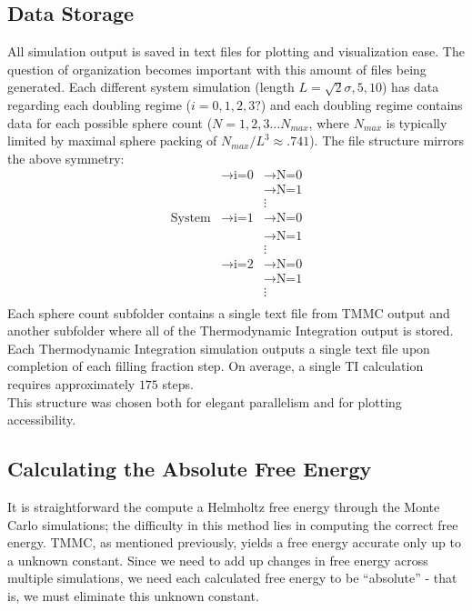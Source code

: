 \documentclass[12pt]{article}
\begin{document}
\subsection{Data Storage}
All simulation output is saved in text files for plotting and visualization ease. The question of organization becomes important with this amount of files being generated. Each different system simulation (length $L = \sqrt2 \sigma, 5,10$) has data regarding each doubling regime ($i=0,1,2,3?$) and each doubling regime contains data for each possible sphere count ($N=1,2,3\dots N_{max}$, where $N_{max}$ is typically limited by maximal sphere packing of $N_{max}/L^3\approx.741$). The file structure mirrors the above symmetry: 
\begin{align*}
                &\rightarrow \text{i=0} &\rightarrow \text{N=0}\\
                & &\rightarrow \text{N=1}\\
                && \vdots\\
\text{System} & \rightarrow \text{i=1} &\rightarrow \text{N=0}\\
                && \rightarrow \text{N=1}\\
                &&\vdots\\
                &\rightarrow \text{i=2} &\rightarrow \text{N=0}\\
                && \rightarrow \text{N=1}\\
                &&\vdots\\
\end{align*}
Each sphere count subfolder contains a single text file from TMMC output and another subfolder where all of the Thermodynamic Integration output is stored. Each Thermodynamic Integration simulation outputs a single text file upon completion of each filling fraction step. On average, a single TI calculation requires approximately $175$ steps. \\
This structure was chosen both for elegant parallelism and for plotting accessibility. 

\subsection{Calculating the Absolute Free Energy}
It is straightforward the compute a Helmholtz free energy through the Monte Carlo simulations; the difficulty in this method lies in computing the correct free energy. TMMC, as mentioned previously, yields a free energy accurate only up to a unknown constant. Since we need to add up changes in free energy across multiple simulations, we need each calculated free energy to be ``absolute'' - that is, we must eliminate this unknown constant. \\
\end{document}
